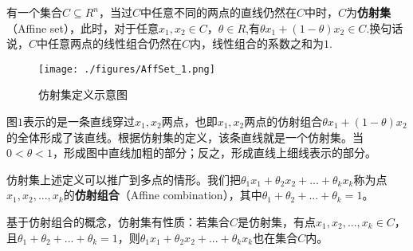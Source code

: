 
有一个集合$C \subseteq R^n$，当过$C$中任意不同的两点的直线仍然在$C$中时，$C$为\textbf{仿射集}（Affine set），此时，对于任意$x_1,x_2 \in C$，$\theta \in R$,有$\theta x_1+(1-\theta)x_2 \in C$.换句话说，$C$中任意两点的线性组合仍然在$C$内，线性组合的系数之和为$1$.

\begin{figure}[ht]
\centering
\texttt{[image: ./figures/AffSet\_1.png]}
\caption{仿射集定义示意图} \label{AffSet_fig1}
\end{figure}

图$1$表示的是一条直线穿过$x_1,x_2$两点，也即$x_1,x_2$两点的仿射组合$\theta x_1+(1-\theta)x_2$的全体形成了该直线。根据仿射集的定义，该条直线就是一个仿射集。当$0<\theta<1$，形成图中直线加粗的部分；反之，形成直线上细线表示的部分。

仿射集上述定义可以推广到多点的情形。我们把$\theta_1x_1+\theta_2x_2+...+\theta_kx_k$称为点$x_1,x_2,...,x_k$的\textbf{仿射组合}（Affine combination），其中$\theta_1+\theta_2+...+\theta_k=1$。

基于仿射组合的概念，仿射集有性质：若集合$C$是仿射集，有点$x_1,x_2,...,x_k \in C$，且$\theta_1+\theta_2+...+\theta_k=1$，则$\theta_1x_1+\theta_2x_2+...+\theta_kx_k$也在集合$C$内。